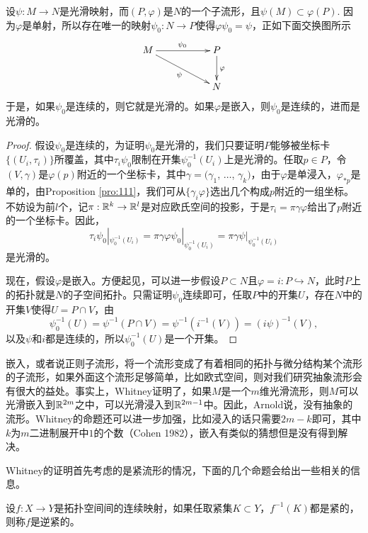 \begin{lem}
设$\psi:M\to N$是光滑映射，而$(P,\varphi)$是$N$的一个子流形，且$\psi(M)\subset \varphi(P)$. 因为$\varphi$是单射，所以存在唯一的映射$\psi_0:N\to P$使得$\varphi\psi_0=\psi$，正如下面交换图所示
\[
\begin{xy}
	\xymatrix{
		M\ar[rrd]_\psi\ar[rr]^{\psi_0}&&P\ar[d]^\varphi\\
		&&N
	}
\end{xy}
\]
于是，如果$\psi_0$是连续的，则它就是光滑的。如果$\varphi$是嵌入，则$\psi_0$是连续的，进而是光滑的。
\end{lem}

\begin{proof}
	假设$\psi_0$是连续的，为证明$\psi_0$是光滑的，我们只要证明$P$能够被坐标卡$\{(U_i,\tau_i)\}$所覆盖，其中$\tau_i\psi_0$限制在开集$\psi_0^{-1}(U_i)$上是光滑的。任取$p\in P$，令$(V,\gamma)$是$\varphi(p)$附近的一个坐标卡，其中$\gamma=(\gamma_1$, $\dots$, $\gamma_k)$，由于$\varphi$是单浸入，$\varphi_{*p}$是单的，由Proposition \ref{pro:111}，我们可从$\{\gamma_i \varphi\}$选出几个构成$p$附近的一组坐标。不妨设为前$l$个，记$\pi:\mathbb{R}^k\to\mathbb{R}^l$是对应欧氏空间的投影，于是$\tau_i=\pi\gamma\varphi$给出了$p$附近的一个坐标卡。因此，
	\[
	\tau_i\psi_0|_{\psi_0^{-1}(U_i)}=\pi\gamma\varphi\psi_0|_{\psi_0^{-1}(U_i)}=\pi\gamma\psi|_{\psi_0^{-1}(U_i)}
	\]
	是光滑的。

	现在，假设$\varphi$是嵌入。方便起见，可以进一步假设$P\subset N$且$\varphi=i:P\hookrightarrow N$，此时$P$上的拓扑就是$N$的子空间拓扑。只需证明$\psi_0$连续即可，任取$P$中的开集$U$，存在$N$中的开集$V$使得$U=P\cap V$，由
	\[
	\psi_0^{-1}(U)=\psi^{-1}(P\cap V)=\psi^{-1}(i^{-1}(V))=(i\psi)^{-1}(V),
	\]
	以及$\psi$和$i$都是连续的，所以$\psi_0^{-1}(U)$是一个开集。
\end{proof}

嵌入，或者说正则子流形，将一个流形变成了有着相同的拓扑与微分结构某个流形的子流形，如果外面这个流形足够简单，比如欧式空间，则对我们研究抽象流形会有很大的益处。事实上，Whitney证明了，如果$M$是一个$m$维光滑流形，则$M$可以光滑嵌入到$\mathbb{R}^{2m}$之中，可以光滑浸入到$\mathbb{R}^{2m-1}$中。因此，Arnold说，没有抽象的流形。Whitney的命题还可以进一步加强，比如浸入的话只需要$2m-k$即可，其中$k$为$m$二进制展开中$1$的个数（Cohen 1982），嵌入有类似的猜想但是没有得到解决。

Whitney的证明首先考虑的是紧流形的情况，下面的几个命题会给出一些相关的信息。

\begin{para}[逆紧性]
设$f:X\to Y$是拓扑空间间的连续映射，如果任取紧集$K\subset Y$，$f^{-1}(K)$都是紧的，则称$f$是逆紧的。
\end{para}

